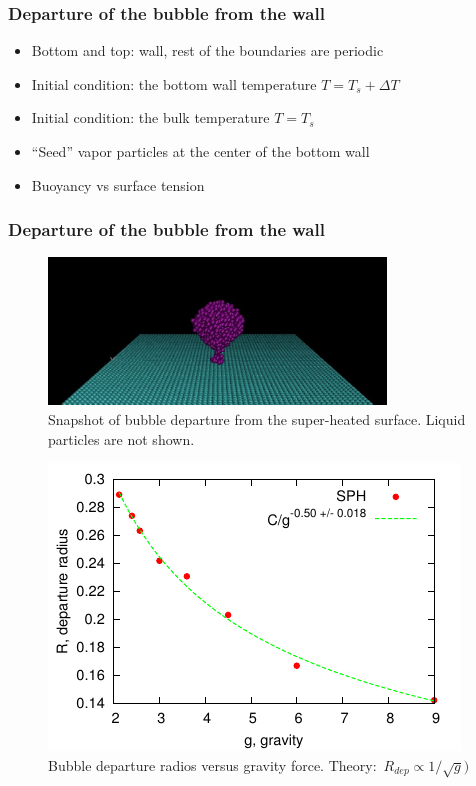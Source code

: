 \documentclass{beamer}
\begin{document}
\begin{frame}
  \frametitle{Departure of the bubble from the wall}
  \begin{itemize}
  \item Bottom and top: wall, rest of the boundaries are periodic
  \item Initial condition: the bottom wall temperature $T=T_s + \Delta T$
  \item Initial condition: the bulk temperature $T=T_s$
  \item ``Seed'' vapor particles at the center of the bottom wall
  \item Buoyancy vs surface tension
  \end{itemize}
\end{frame}

\begin{frame}
  \frametitle{Departure of the bubble from the wall}
  \begin{figure}[ht]
    \centering
    \includegraphics[width=0.8\textwidth]{gnuplot/dep-59.pdf}
    \caption{Snapshot of bubble departure from the super-heated
      surface. Liquid particles are not shown.}
    \label{fig:snapshot}
  \end{figure}
\end{frame}

\begin{frame}
  \begin{figure}[t]
    \centering
    \includegraphics{gnuplot/dep.pdf}
    \caption{Bubble departure radios versus gravity
      force. Theory:~$R_{dep} \propto 1/\sqrt{g})$ }
    \label{fig:radii}
  \end{figure}
  
\end{frame}
\end{document}
